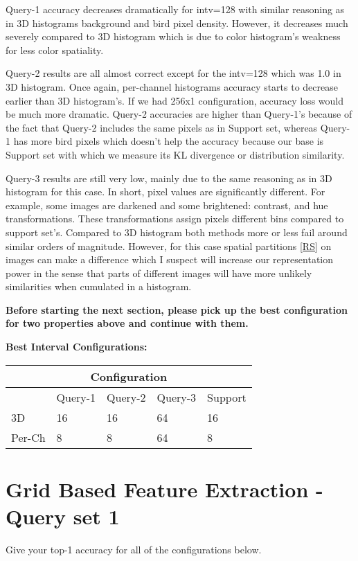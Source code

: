 \documentclass[12pt]{article}
\begin{document}
Query-1 accuracy decreases dramatically for intv=128 with similar reasoning 
as in 3D histograms background and bird pixel density. However, it decreases
much severely compared to 3D histogram which is due to color histogram's weakness
for less color spatiality.

Query-2 results are all almost correct except for the intv=128 which was 
1.0 in 3D histogram. Once again, per-channel histograms accuracy starts to decrease earlier
than 3D histogram's. If we had 256x1 configuration, accuracy loss would be much more dramatic.
Query-2 accuracies are higher than Query-1's because of the fact that 
Query-2 includes the same pixels as in Support set, whereas Query-1 has
more bird pixels which doesn't help the accuracy because our base is Support set
with which we measure its KL divergence or distribution similarity.

Query-3 results are still very low, mainly due to the same reasoning 
as in 3D histogram for this case. In short, pixel values are significantly different.
For example, some images are darkened and some brightened: contrast, and hue transformations.
These transformations assign pixels different bins compared to support set's.
Compared to 3D histogram both methods more or less fail around similar orders of magnitude.
However, for this case spatial partitions \ref{RS} on images can make a difference which I suspect
will increase our representation power in the sense that parts of different images
will have more unlikely similarities when cumulated in a histogram.


\textbf{Before starting the next section, please pick up the best configuration for two properties above and continue with them.}

\vspace*{0.5cm}
\textbf{Best Interval Configurations:}

\begin{tabular}{ |p{1.5cm}||p{2cm}|p{2cm}|p{2cm}|p{2cm}|  }
    \hline
    \multicolumn{5}{|c|}{Configuration} \\
    \hline
     & Query-1 & Query-2 & Query-3 & Support \\
    \hline
    3D & 16 & 16 &  64  & 16 \\
    \hline
    Per-Ch & 8 & 8 & 64  & 8 \\
    \hline
\end{tabular}

\section{Grid Based Feature Extraction - Query set 1}
Give your top-1 accuracy for all of the configurations below.
\end{document}
